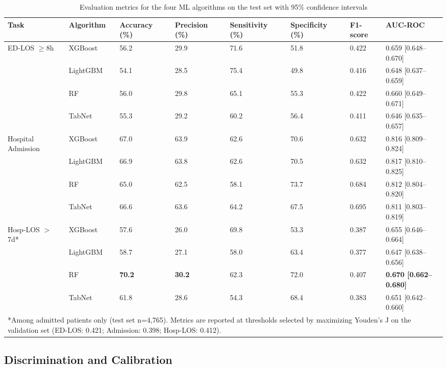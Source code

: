 \documentclass[harvard,article]{frontiersinFPHY_FAMS}
\begin{document}
\begin{table}[t]
\centering
\caption{Evaluation metrics for the four ML algorithms on the test set with 95\% confidence intervals}
\label{tab:results}
\begin{tabular}{p{3.2cm}p{2.0cm}p{1.8cm}p{1.8cm}p{1.8cm}p{1.8cm}p{1.4cm}p{1.6cm}}
\toprule
\textbf{Task} & \textbf{Algorithm} & \textbf{Accuracy (\%)} & \textbf{Precision (\%)} & \textbf{Sensitivity (\%)} & \textbf{Specificity (\%)} & \textbf{F1-score} & \textbf{AUC-ROC} \\
\midrule
\multirow{4}{*}{ED-LOS $\geq$8h} & XGBoost & 56.2 & 29.9 & 71.6 & 51.8 & 0.422 & 0.659 [0.648--0.670] \\
 & LightGBM & 54.1 & 28.5 & 75.4 & 49.8 & 0.416 & 0.648 [0.637--0.659] \\
 & RF & 56.0 & 29.8 & 65.1 & 55.3 & 0.422 & 0.660 [0.649--0.671] \\
 & TabNet & 55.3 & 29.2 & 60.2 & 56.4 & 0.411 & 0.646 [0.635--0.657] \\
\midrule
\multirow{4}{*}{Hospital Admission} & XGBoost & 67.0 & 63.9 & 62.6 & 70.6 & 0.632 & 0.816 [0.809--0.824] \\
 & LightGBM & 66.9 & 63.8 & 62.6 & 70.5 & 0.632 & 0.817 [0.810--0.825] \\
 & RF & 65.0 & 62.5 & 58.1 & 73.7 & 0.684 & 0.812 [0.804--0.820] \\
 & TabNet & 66.6 & 63.6 & 64.2 & 67.5 & 0.695 & 0.811 [0.803--0.819] \\
\midrule
\multirow{4}{*}{Hosp-LOS $>$7d*} & XGBoost & 57.6 & 26.0 & 69.8 & 53.3 & 0.387 & 0.655 [0.646--0.664] \\
 & LightGBM & 58.7 & 27.1 & 58.0 & 63.4 & 0.377 & 0.647 [0.638--0.656] \\
 & RF & \textbf{70.2} & \textbf{30.2} & 62.3 & 72.0 & 0.407 & \textbf{0.670 [0.662--0.680]} \\
 & TabNet & 61.8 & 28.6 & 54.3 & 68.4 & 0.383 & 0.651 [0.642--0.660] \\
\bottomrule
\multicolumn{8}{p{13cm}}{*Among admitted patients only (test set n=4,765). Metrics are reported at thresholds selected by maximizing Youden's J on the validation set (ED-LOS: 0.421; Admission: 0.398; Hosp-LOS: 0.412).} \\
\end{tabular}
\end{table}

\subsection{Discrimination and Calibration}
\end{document}
